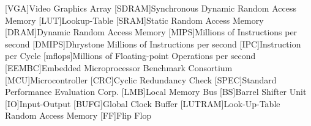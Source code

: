 \begin{acronym}[Bash]
  [VGA]{Video Graphics Array}
[SDRAM]{Synchronous Dynamic Random Access Memory}
 [LUT]{Lookup-Table}
 [SRAM]{Static Random Access Memory}
[DRAM]{Dynamic Random Access Memory}
 [MIPS]{Millions of Instructions per second}
[DMIPS]{Dhrystone Millions of Instructions per second}
 [IPC]{Instruction per Cycle}
[mflops]{Millions of Floating-point Operations per second}
[EEMBC]{Embedded Microprocessor Benchmark Consortium}
[MCU]{Microcontroller}
[CRC]{Cyclic Redundancy Check}
[SPEC]{Standard Performance Evaluation Corp.}
[LMB]{Local Memory Bus}
[BS]{Barrel Shifter Unit}
[IO]{Input-Output}
[BUFG]{Global Clock Buffer}
[LUTRAM]{Look-Up-Table Random Access Memory}
[FF]{Flip Flop}
\end{acronym}
